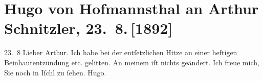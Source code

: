 

         
         \renewcommand{\erwaehntePersonen}{Personen: Hugo von Hofmannsthal}
         \renewcommand{\erwaehnteOrte}{Orte: Bad Ischl, Frankreich, Wien}
         \renewcommand{\erwaehnteWerke}{}
               \section[Hugo von Hofmannsthal an Arthur Schnitzler, 23. 8. {[}1892{]}]{ Hugo von Hofmannsthal an Arthur Schnitzler, 23. 8. {[}1892{]}}\nopagebreak{}\rehead{ }\begin{ledgroupsized}[t]{13cm}\normalsize\beginnumbering \toendnotes[C]{\smallbreak\pagebreak[2]} 
\toendnotes[C]{\smallbreak}\pstart
           \raggedleft{}{\pb}23. 8\pend
           \pstart\center{}Lieber Arthur.\pend\pstart
           Ich habe bei der entſetzlichen Hitze an einer heftigen Beinhautentzündung etc.
               gelitten. An meinem \label{K_L00117-1v}\label{K_L00117-1h} iſt nichts geändert. Ich freue mich, Sie noch in Iſchl zu ſehen.\pend
           \pstart \spacefill\mbox{Hugo.}\pend{}
         
         \endnumbering{}\end{ledgroupsized}  \newcommand{\dateiname}{L00117}\newcommand{\titel}{Hugo von Hofmannsthal an Arthur Schnitzler, 23. 8. [1892]}\newcommand{\editorInnen}{Martin Anton Müller und Gerd-Hermann Susen}
      